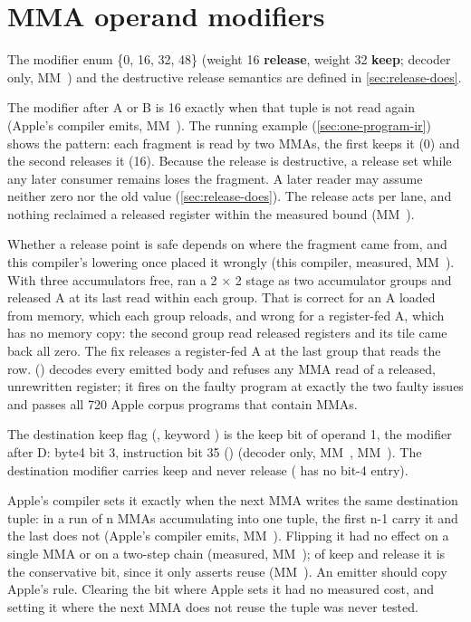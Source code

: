 \section{MMA operand modifiers}\label{sec:modifiers-keep-flag}

The modifier enum \{0, 16, 32, 48\} (weight 16 \textbf{release}, weight 32 \textbf{keep}; decoder only, MM~) and the destructive
release semantics are defined in \cref{sec:release-does}.

The modifier after A or B is 16 exactly when that tuple is not read again (Apple's compiler
emits, MM~). The running example (\cref{sec:one-program-ir}) shows the pattern: each fragment is read by two MMAs,
the first keeps it (0) and the second releases it (16). Because the release is destructive, a release set while any
later consumer remains loses the fragment. A later reader may assume neither zero nor the old value (\cref{sec:release-does}). The release acts per lane, and
nothing reclaimed a released register within the measured bound (MM~).

Whether a release point is safe depends on where the fragment came from, and this compiler's lowering once placed it
wrongly (this compiler, measured, MM~). With three accumulators free,  ran a 2 × 2 stage as two accumulator groups and released A
at its last read within each group. That is correct for an A loaded from memory, which each group reloads, and wrong
for a register-fed A, which has no memory copy: the second group read released registers and its tile came back all
zero. The fix releases a register-fed A at the last group that reads the row. 
() decodes every emitted body and refuses any MMA read of a released, unrewritten register; it fires on
the faulty program at exactly the two faulty issues and passes all 720 Apple corpus programs that contain MMAs.

The destination keep flag (,  keyword ) is the keep bit of operand 1, the modifier after
D: byte4 bit 3, instruction bit 35 () (decoder only, MM~, MM~). The
destination modifier carries keep and never release ( has no bit-4 entry).

Apple's compiler sets it exactly when the next MMA writes the same destination tuple: in a run of n MMAs accumulating
into one tuple, the first n-1 carry it and the last does not (Apple's compiler emits, MM~). Flipping it had
no effect on a single MMA or on a two-step chain (measured, MM~); of keep and release it is the conservative
bit, since it only asserts reuse (MM~). An emitter should copy Apple's rule. Clearing the bit where Apple sets it
had no measured cost, and setting it where the next MMA does not reuse the tuple was never tested.


